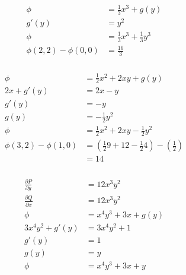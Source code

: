 \documentclass{article}
\begin{document}
\subsubsection{}

\begin{align*}
  \phi                    & = \frac{1}{3} x^3 + g(y)            \\
  g'(y)                   & = y^2                               \\
  \phi                    & = \frac{1}{3} x^3 + \frac{1}{3} y^3 \\
  \phi(2, 2) - \phi(0, 0) & = \frac{16}{3}
\end{align*}

\setcounter{subsubsection}{2}
\subsubsection{}

\begin{align*}
  \phi                    & = \frac{1}{2} x^2 + 2 x y + g(y)                                                 \\
  2 x + g'(y)             & = 2 x - y                                                                        \\
  g'(y)                   & = -y                                                                             \\
  g(y)                    & = -\frac{1}{2} y^2                                                               \\
  \phi                    & = \frac{1}{2} x^2 + 2 x y - \frac{1}{2} y^2                                      \\
  \phi(3, 2) - \phi(1, 0) & = \left( \frac{1}{2} 9 + 12 - \frac{1}{2} 4 \right) - \left( \frac{1}{2} \right) \\
                          & = 14
\end{align*}

\setcounter{subsubsection}{10}
\subsubsection{}

\begin{align*}
  \frac{\partial P}{\partial y} & = 12 x^3 y^2           \\
  \frac{\partial Q}{\partial x} & = 12 x^3 y^2           \\
  \phi                          & = x^4 y^3 + 3 x + g(y) \\
  3 x^4 y^2 + g'(y)             & = 3 x^4 y^2 + 1        \\
  g'(y)                         & = 1                    \\
  g(y)                          & = y                    \\
  \phi                          & = x^4 y^3 + 3 x + y
\end{align*}
\end{document}
